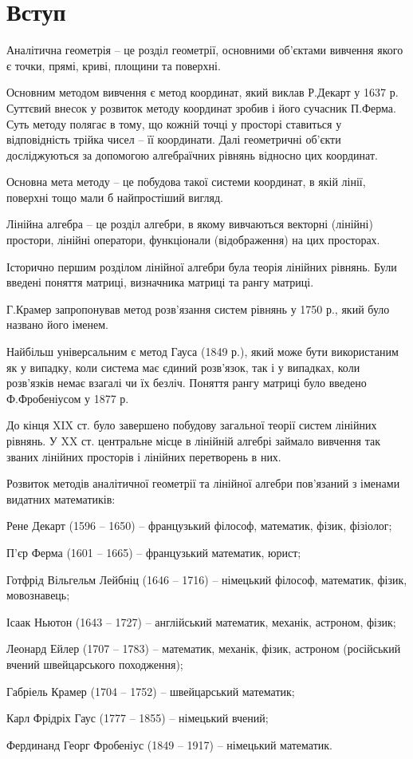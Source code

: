 \chapter{Вступ}

Аналітична геометрія – це розділ геометрії, основними об’єктами вивчення
якого є точки, прямі, криві, площини та поверхні.

Основним методом вивчення є метод координат, який виклав Р.Декарт у
1637 р. Суттєвий внесок у розвиток методу координат зробив і його сучасник
П.Ферма. Суть методу полягає в тому, що кожній точці у просторі ставиться у
відповідність трійка чисел – її координати. Далі геометричні об’єкти
досліджуються за допомогою алгебраїчних рівнянь відносно цих координат.

Основна мета методу – це побудова такої системи координат, в якій лінії,
поверхні тощо мали б найпростіший вигляд.

Лінійна алгебра – це розділ алгебри, в якому вивчаються векторні (лінійні)
простори, лінійні оператори, функціонали (відображення) на цих просторах.

Історично першим розділом лінійної алгебри була теорія лінійних рівнянь.
Були введені поняття матриці, визначника матриці та рангу матриці.

Г.Крамер запропонував метод розв’язання систем рівнянь у 1750 р., який було
названо його іменем.

Найбільш універсальним є метод Гауса (1849 р.), який може бути
використаним як у випадку, коли система має єдиний розв’язок, так і у випадках,
коли розв’язків немає взагалі чи їх безліч. Поняття рангу матриці було введено
Ф.Фробеніусом у 1877 р.

До кінця XIX ст. було завершено побудову загальної теорії систем лінійних
рівнянь. У XX ст. центральне місце в лінійній алгебрі займало вивчення так званих
лінійних просторів і лінійних перетворень в них.

Розвиток методів аналітичної геометрії та лінійної алгебри пов’язаний з
іменами видатних математиків:

Рене Декарт (1596 – 1650) – французький філософ, математик, фізик, фізіолог;

П’єр Ферма (1601 – 1665) – французький математик, юрист;

Готфрід Вільгельм Лейбніц (1646 – 1716) – німецький філософ, математик, фізик,
мовознавець;

Ісаак Ньютон (1643 – 1727) – англійський математик, механік, астроном, фізик;

Леонард Ейлер (1707 – 1783) – математик, механік, фізик, астроном (російський
вчений швейцарського походження);

Габріель Крамер (1704 – 1752) – швейцарський математик;

Карл Фрідріх Гаус (1777 – 1855) – німецький вчений;

Фердинанд Георг Фробеніус (1849 – 1917) – німецький математик. 

